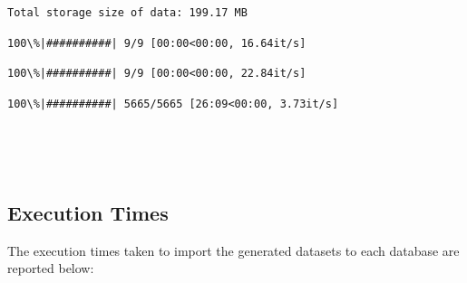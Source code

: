     \begin{Verbatim}[commandchars=\\\{\}]
Total storage size of data: 199.17 MB
    \end{Verbatim}

    
    \begin{Verbatim}[commandchars=\\\{\}]
  100\%|##########| 9/9 [00:00<00:00, 16.64it/s]
    \end{Verbatim}

    
    
    \begin{Verbatim}[commandchars=\\\{\}]
  100\%|##########| 9/9 [00:00<00:00, 22.84it/s]
    \end{Verbatim}

    
    
    \begin{Verbatim}[commandchars=\\\{\}]
  100\%|##########| 5665/5665 [26:09<00:00, 3.73it/s]
    \end{Verbatim}

    
    \begin{center}
    \end{center}
    { \hspace*{\fill} \\}
    
    \begin{center}
    \end{center}
    { \hspace*{\fill} \\}
    
    \hypertarget{execution-times}{%
\subsection{Execution Times}\label{execution-times}}

    The execution times taken to import the generated datasets to each
database are reported below:


